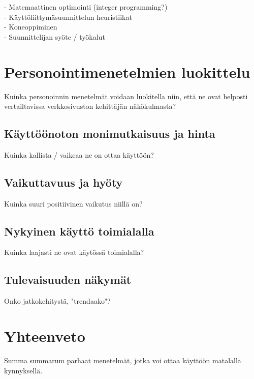 \documentclass[finnish, 12pt, a4paper, elec, utf8, a-1b, online]{aaltothesis}
\begin{document}
- Matemaattinen optimointi (integer programming?)
\\
- Käyttöliittymäsuunnittelun heuristiikat
\\
- Koneoppiminen
\\
- Suunnittelijan syöte / työkalut

\clearpage

\section{Personointimenetelmien luokittelu}

Kuinka personoinnin menetelmät voidaan luokitella niin, että ne ovat helposti
vertailtavissa verkkosivuston kehittäjän näkökulmasta?

\subsection{Käyttöönoton monimutkaisuus ja hinta}

Kuinka kallista / vaikeaa ne on ottaa käyttöön?

\subsection{Vaikuttavuus ja hyöty}

Kuinka suuri positiivinen vaikutus niillä on?

\subsection{Nykyinen käyttö toimialalla}

Kuinka laajasti ne ovat käytössä toimialalla?

\subsection{Tulevaisuuden näkymät}

Onko jatkokehitystä, "trendaako"?

\clearpage

\section{Yhteenveto}

Summa summarum parhaat menetelmät, jotka voi ottaa käyttöön matalalla
kynnyksellä.

\clearpage

\thesisbibliography{}
\printbibliography{}
\end{document}
